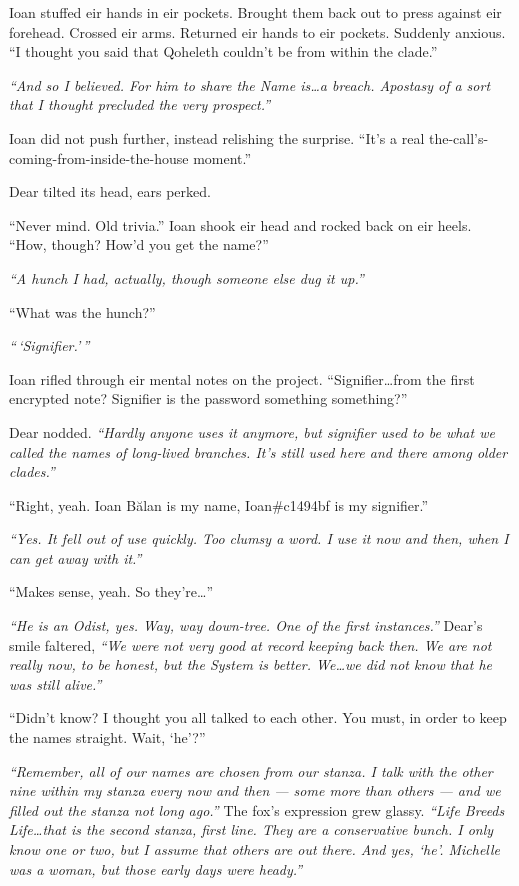 Ioan stuffed eir hands in eir pockets. Brought them back out to press against eir forehead. Crossed eir arms. Returned eir hands to eir pockets. Suddenly anxious. ``I thought you said that Qoheleth couldn't be from within the clade.''

\emph{``And so I believed. For him to share the Name is\ldots{}a breach. Apostasy of a sort that I thought precluded the very prospect.''}

Ioan did not push further, instead relishing the surprise. ``It's a real the-call's-coming-from-inside-the-house moment.''

Dear tilted its head, ears perked.

``Never mind. Old trivia.'' Ioan shook eir head and rocked back on eir heels. ``How, though? How'd you get the name?''

\emph{``A hunch I had, actually, though someone else dug it up.''}

``What was the hunch?''

\emph{``\,`Signifier.'\,''}

Ioan rifled through eir mental notes on the project. ``Signifier\ldots{}from the first encrypted note? Signifier is the password something something?''

Dear nodded. \emph{``Hardly anyone uses it anymore, but signifier used to be what we called the names of long-lived branches. It's still used here and there among older clades.''}

``Right, yeah. Ioan Bălan is my name, Ioan\#c1494bf is my signifier.''

\emph{``Yes. It fell out of use quickly. Too clumsy a word. I use it now and then, when I can get away with it.''}

``Makes sense, yeah. So they're\ldots{}''

\emph{``He is an Odist, yes. Way, way down-tree. One of the first instances.''} Dear's smile faltered, \emph{``We were not very good at record keeping back then. We are not really now, to be honest, but the System is better. We\ldots{}we did not know that he was still alive.''}

``Didn't know? I thought you all talked to each other. You must, in order to keep the names straight. Wait, `he'?''

\emph{``Remember, all of our names are chosen from our stanza. I talk with the other nine within my stanza every now and then — some more than others — and we filled out the stanza not long ago.''} The fox's expression grew glassy. \emph{``Life Breeds Life\ldots{}that is the second stanza, first line. They are a conservative bunch. I only know one or two, but I assume that others are out there. And yes, `he'. Michelle was a woman, but those early days were heady.''}

